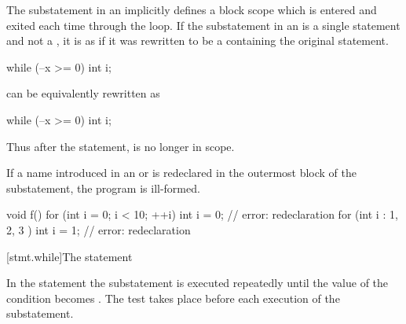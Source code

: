 \pnum
{}%
The substatement in an  implicitly defines
a block scope which is entered and exited each time
through the loop.
If the substatement in an  is
a single statement and not a ,
it is as if it was rewritten to be
a  containing the original statement.
\begin{example}
\begin{codeblock}
while (--x >= 0)
  int i;
\end{codeblock}

can be equivalently rewritten as

\begin{codeblock}
while (--x >= 0) {
  int i;
}
\end{codeblock}

Thus after the  statement,  is no longer in scope.
\end{example}

\pnum
If a name introduced in an
 or 
is redeclared in the outermost block of the substatement, the program is ill-formed.
\begin{example}
\begin{codeblock}
void f() {
  for (int i = 0; i < 10; ++i)
    int i = 0;          // error: redeclaration
  for (int i : { 1, 2, 3 })
    int i = 1;          // error: redeclaration
}
\end{codeblock}
\end{example}

[stmt.while]{The  statement}%

\pnum
In the  statement the substatement is executed repeatedly
until the value of the condition becomes
. The test takes place before each execution of the
substatement.

